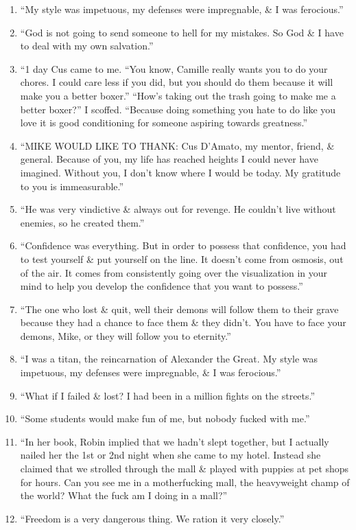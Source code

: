 \documentclass{article}
\numberwithin{equation}{section}
\begin{document}
\begin{enumerate}
	\item ``My style was impetuous, my defenses were impregnable, \& I was ferocious.''
	\item ``God is not going to send someone to hell for my mistakes. So God \& I have to deal with my own salvation.''
	\item ``1 day Cus came to me. ``You know, Camille really wants you to do your chores. I could care less if you did, but you should do them because it will make you a better boxer.'' ``How's taking out the trash going to make me a better boxer?'' I scoffed. ``Because doing something you hate to do like you love it is good conditioning for someone aspiring towards greatness.''
	\item ``MIKE WOULD LIKE TO THANK: Cus D'Amato, my mentor, friend, \& general. Because of you, my life has reached heights I could never have imagined. Without you, I don't know where I would be today. My gratitude to you is immeasurable.''
	\item ``He was very vindictive \& always out for revenge. He couldn't live without enemies, so he created them.''
	\item ``Confidence was everything. But in order to possess that confidence, you had to test yourself \& put yourself on the line. It doesn't come from osmosis, out of the air. It comes from consistently going over the visualization in your mind to help you develop the confidence that you want to possess.''
	\item ``The one who lost \& quit, well their demons will follow them to their grave because they had a chance to face them \& they didn't. You have to face your demons, Mike, or they will follow you to eternity.''
	\item ``I was a titan, the reincarnation of Alexander the Great. My style was impetuous, my defenses were impregnable, \& I was ferocious.''
	\item ``What if I failed \& lost? I had been in a million fights on the streets.''
	\item ``Some students would make fun of me, but nobody fucked with me.''
	\item ``In her book, Robin implied that we hadn't slept together, but I actually nailed her the 1st or 2nd night when she came to my hotel. Instead she claimed that we strolled through the mall \& played with puppies at pet shops for hours. Can you see me in a motherfucking mall, the heavyweight champ of the world? What the fuck am I doing in a mall?''
	\item ``Freedom is a very dangerous thing. We ration it very closely.''

\end{enumerate}
\end{document}
